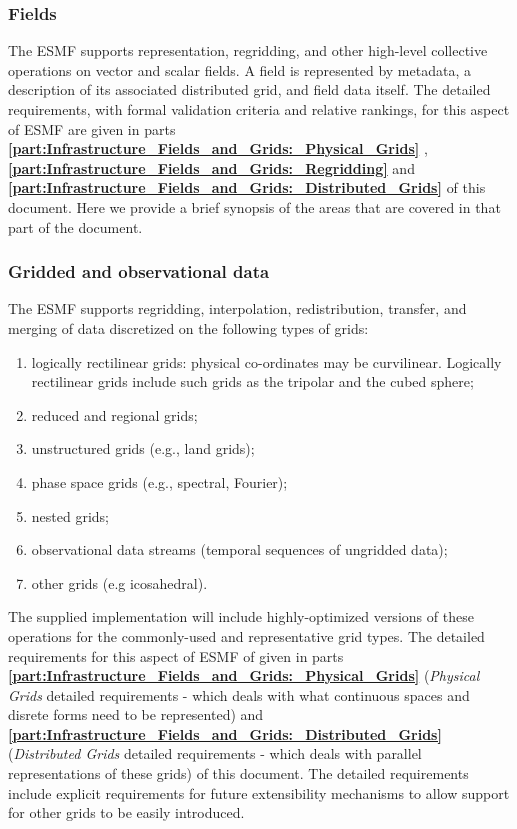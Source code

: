 \subsubsection{Fields}
The ESMF supports representation, regridding, and other high-level
collective operations on vector and scalar fields.  A field is represented 
by metadata, a description of its associated distributed grid, and field 
data itself.
The detailed requirements, with formal validation criteria
and relative rankings, for this aspect of ESMF are given
in parts {\bf \ref{part:Infrastructure_Fields_and_Grids:_Physical_Grids} },
{\bf \ref{part:Infrastructure_Fields_and_Grids:_Regridding} }
and 
{\bf \ref{part:Infrastructure_Fields_and_Grids:_Distributed_Grids} } of this document.
Here we provide a brief synopsis of the areas that are covered
in that part of the document.

\subsubsection{Gridded and observational data}

The ESMF supports regridding, interpolation, redistribution,
transfer, and merging of data discretized on the following types of grids:

\begin{enumerate}
\item logically rectilinear grids: physical co-ordinates may be
  curvilinear. Logically rectilinear grids include such grids as the
  tripolar and the cubed sphere;
\item reduced and regional grids;
\item unstructured grids (e.g., land grids);
\item phase space grids (e.g., spectral, Fourier);
\item nested grids;
\item observational data streams (temporal sequences of ungridded data);
\item other grids (e.g icosahedral).
\end{enumerate}


The supplied implementation will include highly-optimized versions of
these operations for the commonly-used and representative grid types. The detailed 
requirements for this aspect of ESMF of given in parts 
{\bf \ref{part:Infrastructure_Fields_and_Grids:_Physical_Grids} } ({\it Physical Grids}
detailed requirements - which deals with what continuous spaces and disrete forms
need to be represented) and 
{\bf \ref{part:Infrastructure_Fields_and_Grids:_Distributed_Grids} } 
({\it Distributed Grids} detailed requirements - which deals with parallel representations
of these grids)
of this document.
The detailed requirements include explicit requirements for future extensibility mechanisms to allow
support for other grids to be easily introduced.

